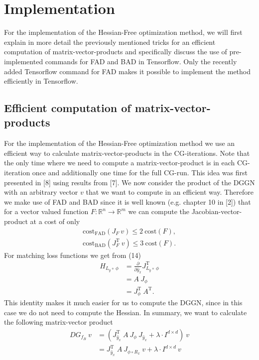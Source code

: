 \documentclass[conference]{IEEEtran}
\begin{document}
	
	
	\section {Implementation}
	For the implementation of the Hessian-Free optimization method, we will first explain in more detail the previously mentioned tricks for an efficient computation of matrix-vector-products and specifically discuss the use of pre-implemented commands for FAD and BAD in Tensorflow. Only the recently added Tensorflow command for FAD makes it possible to implement the method efficiently in Tensorflow.
	
	
	\subsection{Efficient computation of matrix-vector-products}
	For the implementation of the Hessian-Free optimization method we use an efficient way to calculate matrix-vector-products in the CG-iterations. Note that the only time where we need to compute a matrix-vector-product is in each CG-iteration once and additionally one time for the full CG-run. This idea was first presented in [8] using results from [7]. We now consider the product of the DGGN with an arbitrary vector $v$ that we want to compute in an efficient way.
	Therefore we make use of FAD and BAD since it is well known (e.g. chapter 10 in [2]) that for a vector valued function $F:\mathbb{R}^{n}\rightarrow\mathbb{R}^{m}$ we can compute the Jacobian-vector-product at a cost of only
	\begin{align}
	\mathrm{cost}_{\text{FAD}}(J_{F}\:v)\leq 2\:\mathrm{cost}(F),\\
	\mathrm{cost}_{\text{BAD}}(J_{F}^{\mathrm{T}}\:v)\leq 3\:\mathrm{cost}(F).
	\end{align}
	For matching loss functions we get from (14)
	\begin{align}
	H_{L_{y}\circ\:\phi} &= \frac{\partial}{\partial \hat{y}_{x}}J_{L_{y}\circ\:\phi}^{\mathrm{T}} \\
	&= A\:J_{\phi} \\
	&= J_{\phi}^{\mathrm{T}}\:A^{\mathrm{T}}.
	\end{align}
	This identity makes it much easier for us to compute the DGGN, since in this case we do not need to compute the Hessian. In summary, we want to calculate the following matrix-vector product
	\begin{align}
	DG_{f_{B}}\:v &=  \left(J_{\hat{y}_{x}}^{\mathrm{T}}\:A\:J_{\phi}\:J_{\hat{y}_{x}} + \lambda\cdot I^{d\times d}\right)\:v\\
	&= J_{\hat{y}_{x}}^{\mathrm{T}}\:A\:J_{\phi\circ R _{x}}\:v + \lambda\cdot I^{d\times d}\:v
	\end{align}
\end{document}
